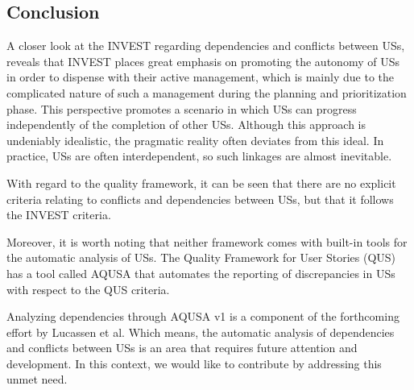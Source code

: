 \subsection{Conclusion} \label{usq_conclusion}
A closer look at the INVEST regarding dependencies and conflicts between USs, reveals that INVEST places great emphasis on promoting the autonomy of USs in order to dispense with their active management, which is mainly due to the complicated nature of such a management during the planning and prioritization phase. This perspective promotes a scenario in which USs can progress independently of the completion of other USs. Although this approach is undeniably idealistic, the pragmatic reality often deviates from this ideal. In practice, USs are often interdependent, so such linkages are almost inevitable. 

With regard to the quality framework, it can be seen that there are no explicit criteria relating to conflicts and dependencies between USs, but that it follows the INVEST criteria.

Moreover, it is worth noting that neither framework comes with built-in tools for the automatic analysis of USs. %
The Quality Framework for User Stories (QUS) has a tool called AQUSA that automates the reporting of discrepancies in USs with respect to the QUS criteria. 

Analyzing dependencies through AQUSA v1 is a component of the forthcoming effort by Lucassen et al. Which means, the automatic analysis of dependencies and conflicts between USs is an area that requires future attention and development. In this context, we would like to contribute by addressing this unmet need.
